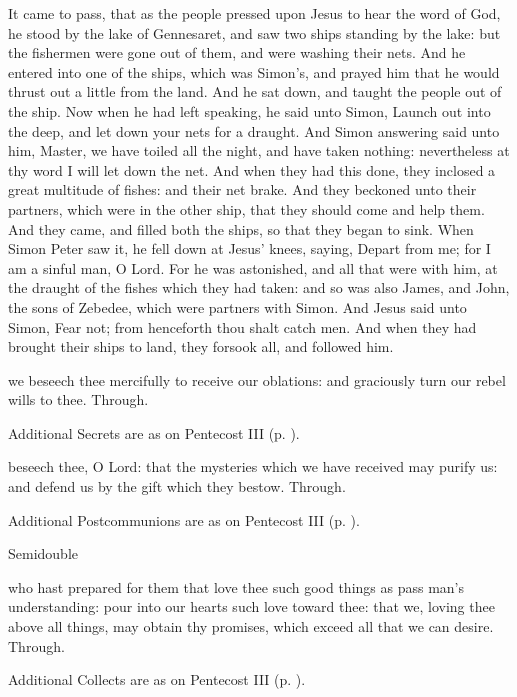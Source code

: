  It came to pass, that as the people pressed upon Jesus to hear the word of God, he stood by the lake of Gennesaret, and saw two ships standing by the lake: but the fishermen were gone out of them, and were washing their nets. And he entered into one of the ships, which was Simon’s, and prayed him that he would thrust out a little from the land. And he sat down, and taught the people out of the ship. Now when he had left speaking, he said unto Simon, Launch out into the deep, and let down your nets for a draught. And Simon answering said unto him, Master, we have toiled all the night, and have taken nothing: nevertheless at thy word I will let down the net. And when they had this done, they inclosed a great multitude of fishes: and their net brake. And they beckoned unto their partners, which were in the other ship, that they should come and help them. And they came, and filled both the ships, so that they began to sink. When Simon Peter saw it, he fell down at Jesus’ knees, saying, Depart from me; for I am a sinful man, O Lord. For he was astonished, and all that were with him, at the draught of the fishes which they had taken: and so was also James, and John, the sons of Zebedee, which were partners with Simon. And Jesus said unto Simon, Fear not; from henceforth thou shalt catch men. And when they had brought their ships to land, they forsook all, and followed him.

\secret
{} we beseech thee mercifully to receive our oblations: and graciously turn our rebel wills to thee. Through.
\begin{rubric}
    Additional Secrets are as on Pentecost III (p. \pageref{PentecostIII}).
\end{rubric}

\postcommunion
{} beseech thee, O Lord: that the mysteries which we have received may purify us: and defend us by the gift which they bestow. Through.
\begin{rubric}
    Additional Postcommunions are as on Pentecost III (p. \pageref{PentecostIII}).
\end{rubric}

\begin{inhead}
    {Semidouble}
\end{inhead}

\collect
{} who hast prepared for them that love thee such good things as pass man's understanding: pour into our hearts such love toward thee: that we, loving thee above all things, may obtain thy promises, which exceed all that we can desire. Through.
\begin{rubric}
    Additional Collects are as on Pentecost III (p. \pageref{PentecostIII}).
\end{rubric}


